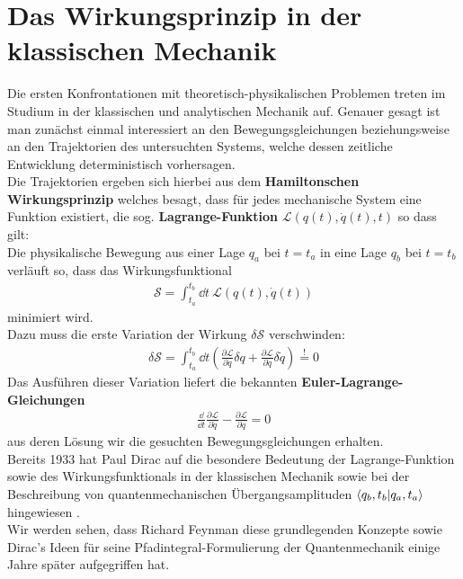 \section{Das Wirkungsprinzip in der klassischen Mechanik}
Die ersten Konfrontationen mit theoretisch-physikalischen Problemen treten im Studium in der klassischen und analytischen Mechanik auf. Genauer gesagt ist man zunächst einmal interessiert an den Bewegungsgleichungen beziehungsweise an den Trajektorien des untersuchten Systems, welche dessen zeitliche Entwicklung deterministisch vorhersagen. \\
Die Trajektorien ergeben sich hierbei aus dem \textbf{Hamiltonschen Wirkungsprinzip} welches besagt, dass für jedes mechanische System eine Funktion existiert, die sog. \textbf{Lagrange-Funktion} $\mathcal{L}(q(t),\dot{q}(t),t)$ so dass gilt: \\

Die physikalische Bewegung aus einer Lage $q_a$ bei $t = t_a$ in eine Lage $q_b$ bei $t = t_b$ verläuft so, dass das Wirkungsfunktional
\begin{align}
	\mathcal{S} = \int_{t_a}^{t_b} \dd t \ \mathcal{L}(q(t),\dot{q}(t)) 
\end{align}
minimiert wird. \\
Dazu muss die erste Variation der Wirkung $\delta\mathcal{S}$ verschwinden:
\begin{align}
		\delta \mathcal{S} = \int_{t_a}^{t_b} \dd t \left(\frac{\partial \mathcal{L}}{\partial q} \delta q + \frac{\partial \mathcal{L}}{\partial \dot{q}} \delta \dot{q}\right) \overset{!}{ = } 0
	\end{align}
Das Ausführen dieser Variation liefert die bekannten \textbf{Euler-Lagrange-Gleichungen} 
\begin{align}
		\frac{\dd}{\dd t}\frac{\partial \mathcal{L}}{\partial \dot{q}} - \frac{\partial \mathcal{L}}{\partial q} = 0
\end{align}
aus deren Lösung wir die gesuchten Bewegungsgleichungen erhalten. \\
Bereits 1933 hat Paul Dirac auf die besondere Bedeutung der Lagrange-Funktion sowie des Wirkungsfunktionals in der klassischen Mechanik sowie bei der Beschreibung von quantenmechanischen Übergangsamplituden $\braket{q_b,t_b}{q_a,t_a}$ hingewiesen \cite{Dirac1934}. \\
Wir werden sehen, dass Richard Feynman diese grundlegenden Konzepte sowie Dirac's Ideen für seine Pfadintegral-Formulierung der Quantenmechanik einige Jahre später aufgegriffen hat.


